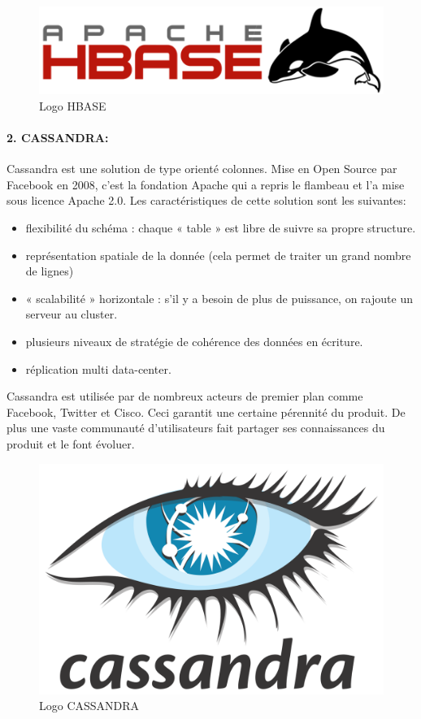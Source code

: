 \begin{figure}[h]
	\centering
    \includegraphics[scale=0.4]{img/4.9}
    \caption{Logo HBASE}
\end{figure}

\paragraph{2. CASSANDRA:}
Cassandra est une solution de type orienté colonnes. Mise en Open Source par Facebook en 2008, c’est la fondation Apache qui a repris le flambeau et l’a mise sous licence Apache 2.0. Les caractéristiques de cette solution sont les suivantes:

\begin{itemize}[label=]
\item flexibilité du schéma : chaque « table » est libre de suivre sa propre structure.
\item représentation spatiale de la donnée (cela permet de traiter un grand nombre de lignes)
\item « scalabilité » horizontale : s’il y a besoin de plus de puissance, on rajoute un serveur au cluster.
\item plusieurs niveaux de stratégie de cohérence des données en écriture.
\item réplication multi data-center.
\end{itemize}

Cassandra est utilisée par de nombreux acteurs de premier plan comme Facebook, Twitter et Cisco. Ceci garantit une certaine pérennité du produit. De plus une vaste communauté d’utilisateurs fait partager ses connaissances du produit et le font évoluer.

\begin{figure}[h]
	\centering
    \includegraphics[scale=0.1]{img/4.10}
    \caption{Logo CASSANDRA}
\end{figure}

